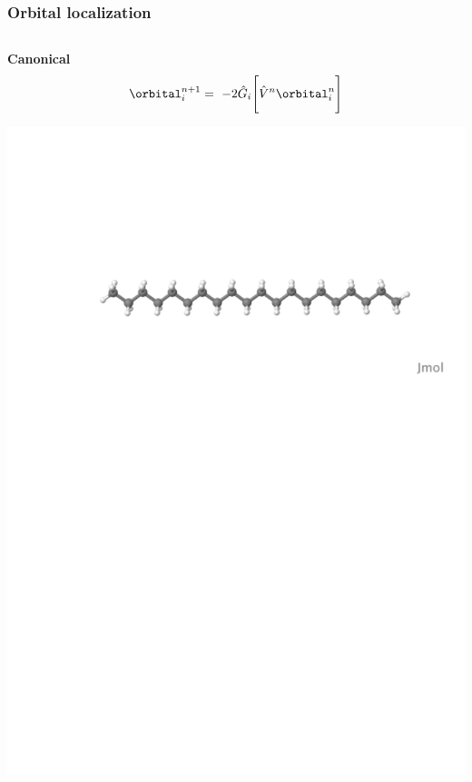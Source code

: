 \begin{frame}
    \frametitle{Orbital localization}
    \begin{columns}
    \begin{column}[b]{0.48\linewidth}
    \begin{center}
    \textbf{Canonical}
    \begin{equation}
        \nonumber
        \orbital_i^{n+1} =\ -2\hat{G}_i\Bigg[\hat{V}^n\orbital_i^n\Bigg]
    \end{equation}

    \vspace{8mm}

    \includegraphics[scale=0.3, clip, viewport = 80 560 600 700]
        {figures/alkane.pdf}\\

\end{center}
\end{column}
\end{columns}
\end{frame}
